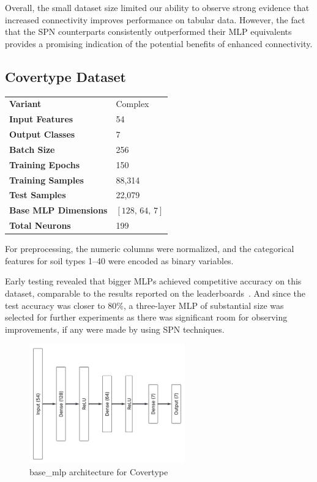 Overall, the small dataset size limited our ability to observe strong evidence that increased connectivity improves performance on tabular data. However, the fact that the SPN counterparts consistently outperformed their MLP equivalents provides a promising indication of the potential benefits of enhanced connectivity.

\subsection{Covertype Dataset}

\begin{tabular}{@{}ll@{}}
\textbf{Variant} & Complex \\
\textbf{Input Features} & 54 \\
\textbf{Output Classes} & 7 \\
\textbf{Batch Size} & 256 \\
\textbf{Training Epochs} & 150 \\
\textbf{Training Samples} & 88,314 \\
\textbf{Test Samples} & 22,079 \\
\textbf{Base MLP Dimensions} & $[128,\, 64,\, 7]$ \\
\textbf{Total Neurons} & 199 \\
\end{tabular}

For preprocessing, the numeric columns were normalized, and the categorical features for soil types 1–40 were encoded as binary variables.

Early testing revealed that bigger MLPs achieved competitive accuracy on this dataset, comparable to the results reported on the leaderboards~\cite{kaggle_covertype_leaderboard}. And since the test accuracy was closer to 80\%, a three-layer MLP of substantial size was selected for further experiments as there was significant room for observing improvements, if any were made by using SPN techniques.

\begin{figure}[H]
    \centering
    \includegraphics[height=0.28\textheight,width=0.6\textwidth]{Figures/Results/Covertype/Covertype_base_mlp_architecture.png} 
    \captionsetup{justification=centering}  %
    \caption{base\_mlp architecture for Covertype}
    \label{fig:covertypeMlpBaseArch}
\end{figure}

